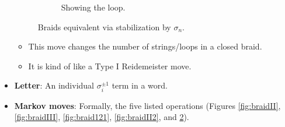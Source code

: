 \documentclass[titlepage]{article}
\numberwithin{figure}{section}
\numberwithin{table}{section}
\numberwithin{equation}{section}
\begin{document}
\begin{itemize}
\begin{figure}[h!]
\begin{subfigure}[b]{0.2\linewidth}
            \caption{Showing the loop.}
            \label{fig:braidIc}
        \end{subfigure}
        \caption{Braids equivalent via stabilization by $\sigma_n$.}
        \label{fig:braidI}
    \end{figure}
    \begin{itemize}
        \item This move changes the number of strings/loops in a closed braid.
        \item It is kind of like a Type I Reidemeister move.
    \end{itemize}
    \item \textbf{Letter}: An individual $\sigma_i^{\pm 1}$ term in a word.
    \item \textbf{Markov moves}: Formally, the five listed operations (Figures \ref{fig:braidII}, \ref{fig:braidIII}, \ref{fig:braid121}, \ref{fig:braidII2}, and \ref{fig:braidI}).
\end{itemize}
\end{document}
